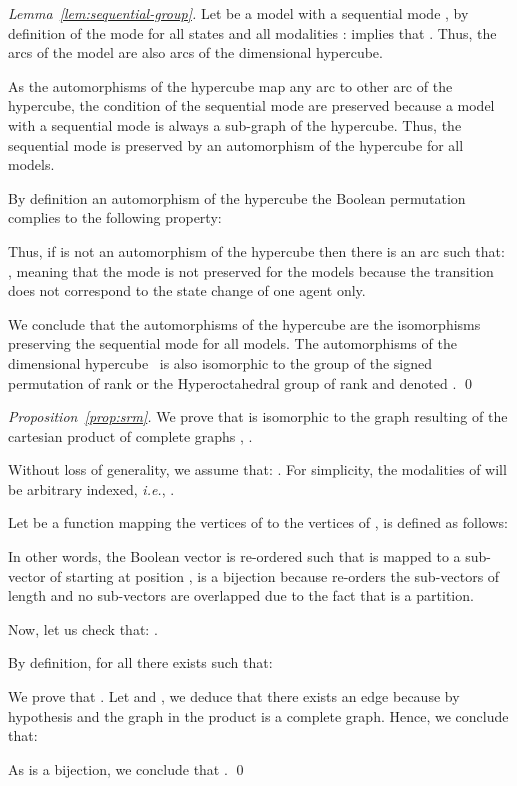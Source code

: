 \documentclass[12pt]{elsarticle}
\newcommand{\abbrev}[1]{#1, \relax}
\newcommand{\ie}[0]{\abbrev{\textit{i.e.}}}
\begin{document}
\begin{proof}[Lemma~\ref{lem:sequential-group}] 
Let  be a model with a sequential mode  , by definition of the mode for all states  and all modalities :   implies that . Thus, the arcs of the model are also arcs of the  dimensional hypercube.

\noindent
 As the automorphisms of the hypercube map any arc to other arc of the hypercube, the condition of the sequential mode are preserved because a model with a sequential mode is always a sub-graph of the hypercube. Thus, the sequential mode is preserved by an automorphism of the hypercube for all models. 

\noindent
\medskip
 
By definition an automorphism of the hypercube the Boolean permutation  complies to the following property: 
 
Thus, if  is not an automorphism of the hypercube then there is an arc  such that: , meaning that the mode is not preserved for the models because the transition  does not correspond to the state change of one agent only.

We conclude that the automorphisms of the hypercube are the isomorphisms preserving the sequential mode for all models. The automorphisms of the dimensional hypercube~\cite{Harary2000, Chen1993} is also  isomorphic to the group of the signed permutation of rank  or the Hyperoctahedral group of rank  and denoted .
\qed \end{proof}

\begin{proof}[Proposition~\ref{prop:srm}]
We prove that  is isomorphic to the graph resulting of the cartesian product of  complete graphs , . 

Without loss of generality, we assume that: . For simplicity, the modalities of  will be arbitrary indexed, \ie . 

\medskip
\noindent
Let  be a function mapping the vertices of  to the vertices of ,  is defined as follows:



\medskip
\noindent
 In other words, the Boolean vector  is re-ordered such that  is mapped to a sub-vector of  starting at position , 
\medskip
\noindent
 is a bijection because  re-orders the  sub-vectors of length  and no sub-vectors are overlapped due to the fact that  is a partition.

\medskip
\noindent
Now, let us check that: . 

\noindent
 By definition, for all  there exists  such that: 
 

\noindent
We prove that  . 
 Let  and ,  we deduce that there exists an edge 
 because  by hypothesis and the  graph in the product is a complete graph. Hence, we conclude that: 

\noindent


\medskip
\noindent
As  is a bijection, we conclude that .
\qed \end{proof}
\end{document}

